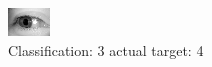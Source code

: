 \begin{figure}[h!]
\begin{center}
\includegraphics[width=0.60\columnwidth]{figures/ID3274_class_3_target_4.png}
\end{center}
\caption{ Classification: 3 actual target: 4}
\label{fig:ID3274_class_3_target_4}
\end{figure}
